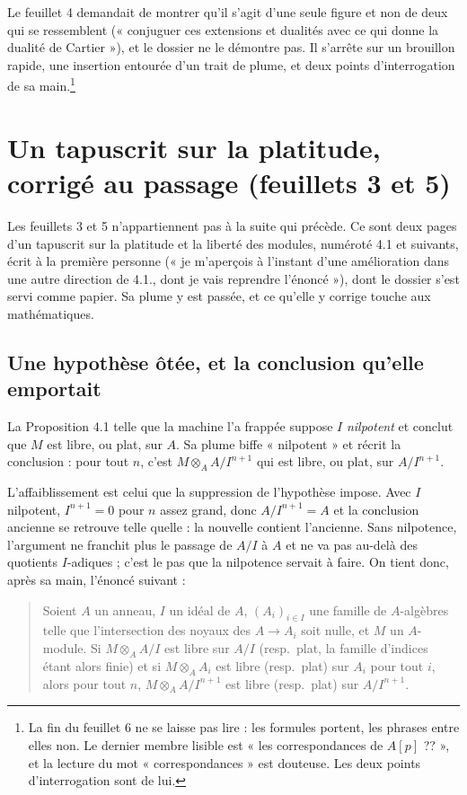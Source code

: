 \documentclass[11pt,a4paper]{article}
\begin{document}
Le feuillet 4 demandait de montrer qu'il s'agit d'une seule figure et non de
deux qui se ressemblent (« conjuguer ces extensions et
dualités avec ce qui donne la dualité de Cartier »), et le dossier ne le
démontre pas. Il s'arrête sur un brouillon rapide, une insertion entourée d'un
trait de plume, et deux points d'interrogation de sa main.\footnote{La fin du
feuillet 6 ne se laisse pas lire : les formules portent, les phrases entre
elles non. Le dernier membre lisible est « les correspondances de $A[p]$ ?? »,
et la lecture du mot « correspondances » est douteuse. Les deux points
d'interrogation sont de lui.}

\section*{Un tapuscrit sur la platitude, corrigé au passage (feuillets 3 et 5)}

Les feuillets 3 et 5 n'appartiennent pas à la suite qui précède. Ce sont deux
pages d'un tapuscrit sur la platitude et la liberté des modules, numéroté 4.1
et suivants, écrit à la première personne (« je m'aperçois à l'instant d'une
amélioration dans une autre direction de 4.1., dont je vais reprendre
l'énoncé »), dont le dossier s'est servi comme papier. Sa plume y est passée,
et ce qu'elle y corrige touche aux mathématiques.

\subsection*{Une hypothèse ôtée, et la conclusion qu'elle emportait}

La Proposition 4.1 telle que la machine l'a frappée suppose $I$ \emph{nilpotent}
et conclut que $M$ est libre, ou plat, sur $A$. Sa plume biffe « nilpotent » et
récrit la conclusion : pour tout $n$, c'est $M \otimes_A A/I^{n+1}$ qui est
libre, ou plat, sur $A/I^{n+1}$.

L'affaiblissement est celui que la suppression de
l'hypothèse impose. Avec $I$ nilpotent, $I^{n+1} = 0$ pour $n$ assez
grand, donc $A/I^{n+1} = A$ et la conclusion ancienne se retrouve telle quelle :
la nouvelle contient l'ancienne. Sans nilpotence, l'argument ne franchit plus
le passage de $A/I$ à $A$ et ne va pas au-delà des quotients $I$-adiques ; c'est
le pas que la nilpotence servait à faire. On tient donc, après sa
main, l'énoncé suivant :

\begin{quote}
Soient $A$ un anneau, $I$ un idéal de $A$, $(A_i)_{i \in I}$ une famille de
$A$-algèbres telle que l'intersection des noyaux des $A \to A_i$ soit nulle, et
$M$ un $A$-module. Si $M \otimes_A A/I$ est libre sur $A/I$ (resp.\ plat, la
famille d'indices étant alors finie) et si $M \otimes_A A_i$ est libre
(resp.\ plat) sur $A_i$ pour tout $i$, alors pour tout $n$, $M \otimes_A
A/I^{n+1}$ est libre (resp.\ plat) sur $A/I^{n+1}$.
\end{quote}
\end{document}
